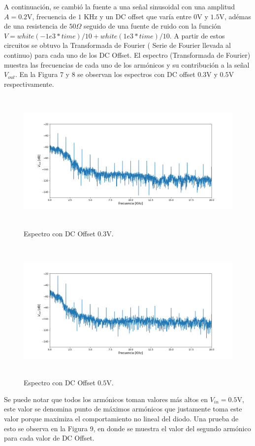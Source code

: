 \documentclass[letterpaper,oneside]{article}
\begin{document}
A continuación, se cambió la fuente a una señal sinusoidal con una amplitud $A=0.2$V, frecuencia de $1$ KHz y un DC offset que varía entre $0$V y $1.5$V, adémas de una resistencia de $50\Omega$ seguido de una fuente de ruido con la función $V=white(-1e3*time)/10 + white(1e3*time)/10$. A partir de estos circuitos se obtuvo la Transformada de Fourier ( Serie de Fourier llevada al continuo) para cada uno de los DC Offset. El espectro (Transformada de Fourier) muestra las frecuencias de cada uno de los armónicos y su contribución a la señal $V_{out}$. 
En la Figura 7 y 8 se observan los espectros con DC offset $0.3$V y $0.5$V respectivamente. 

\begin{figure}
  \centering
  \includegraphics[height=7cm]{../graficos/espectro03.png}
  \caption{Espectro con DC Offset $0.3$V.}
\end{figure}

\begin{figure}
  \centering
  \includegraphics[height=7cm]{../graficos/espectro05.png}
  \caption{Espectro con DC Offset $0.5$V.}
\end{figure}

Se puede notar que todos los armónicos toman valores más altos en $V_{in}=0.5$V, este valor se denomina punto de máximos armónicos que justamente toma este valor porque maximiza el comportamiento no lineal del diodo. Una prueba de esto se observa en la Figura 9, en donde se muestra el valor del segundo armónico para cada valor de DC Offset.
\end{document}
